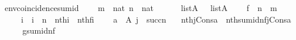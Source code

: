 \begin{isabellebody}
\endisatagproof
{\isafoldproof}%
%
\isadelimproof
\isanewline
%
\endisadelimproof
\isanewline
{}\isamarkupfalse%
\ env{\isacharunderscore}{\kern0pt}coincidence{\isacharunderscore}{\kern0pt}sum{\isacharunderscore}{\kern0pt}id\ {\isacharcolon}{\kern0pt}\isanewline
\ \ \ {\isachardoublequoteopen}m\ {\isasymin}\ nat{\isachardoublequoteclose}\ {\isachardoublequoteopen}n\ {\isasymin}\ nat{\isachardoublequoteclose}\isanewline
\ \ \ \ {\isachardoublequoteopen}{\isasymrho}\ {\isasymin}\ list{\isacharparenleft}{\kern0pt}A{\isacharparenright}{\kern0pt}{\isachardoublequoteclose}\ {\isachardoublequoteopen}{\isasymrho}{\isacharprime}{\kern0pt}\ {\isasymin}\ list{\isacharparenleft}{\kern0pt}A{\isacharparenright}{\kern0pt}{\isachardoublequoteclose}\isanewline
\ \ \ \ {\isachardoublequoteopen}f\ {\isasymin}\ n\ {\isasymrightarrow}\ m{\isachardoublequoteclose}\isanewline
\ \ \ \ {\isachardoublequoteopen}{\isasymAnd}\ i\ {\isachardot}{\kern0pt}\ i\ {\isacharless}{\kern0pt}\ n\ {\isasymLongrightarrow}\ nth{\isacharparenleft}{\kern0pt}i{\isacharcomma}{\kern0pt}{\isasymrho}{\isacharparenright}{\kern0pt}\ {\isacharequal}{\kern0pt}\ nth{\isacharparenleft}{\kern0pt}f{\isacharbackquote}{\kern0pt}i{\isacharcomma}{\kern0pt}{\isasymrho}{\isacharprime}{\kern0pt}{\isacharparenright}{\kern0pt}{\isachardoublequoteclose}\isanewline
\ \ \ \ {\isachardoublequoteopen}a\ {\isasymin}\ A{\isachardoublequoteclose}\ {\isachardoublequoteopen}j\ {\isasymin}\ succ{\isacharparenleft}{\kern0pt}n{\isacharparenright}{\kern0pt}{\isachardoublequoteclose}\isanewline
\ \ \ {\isachardoublequoteopen}nth{\isacharparenleft}{\kern0pt}j{\isacharcomma}{\kern0pt}Cons{\isacharparenleft}{\kern0pt}a{\isacharcomma}{\kern0pt}{\isasymrho}{\isacharparenright}{\kern0pt}{\isacharparenright}{\kern0pt}\ {\isacharequal}{\kern0pt}\ nth{\isacharparenleft}{\kern0pt}sum{\isacharunderscore}{\kern0pt}id{\isacharparenleft}{\kern0pt}n{\isacharcomma}{\kern0pt}f{\isacharparenright}{\kern0pt}{\isacharbackquote}{\kern0pt}j{\isacharcomma}{\kern0pt}Cons{\isacharparenleft}{\kern0pt}a{\isacharcomma}{\kern0pt}{\isasymrho}{\isacharprime}{\kern0pt}{\isacharparenright}{\kern0pt}{\isacharparenright}{\kern0pt}{\isachardoublequoteclose}\isanewline
%
\isadelimproof
%
\endisadelimproof
%
\isatagproof
{}\isamarkupfalse%
\ {\isacharminus}{\kern0pt}\isanewline
\ \ \isamarkupfalse%
\ {\isacharquery}{\kern0pt}g{\isacharequal}{\kern0pt}{\isachardoublequoteopen}sum{\isacharunderscore}{\kern0pt}id{\isacharparenleft}{\kern0pt}n{\isacharcomma}{\kern0pt}f{\isacharparenright}{\kern0pt}{\isachardoublequoteclose}\isanewline

\end{isabellebody}
